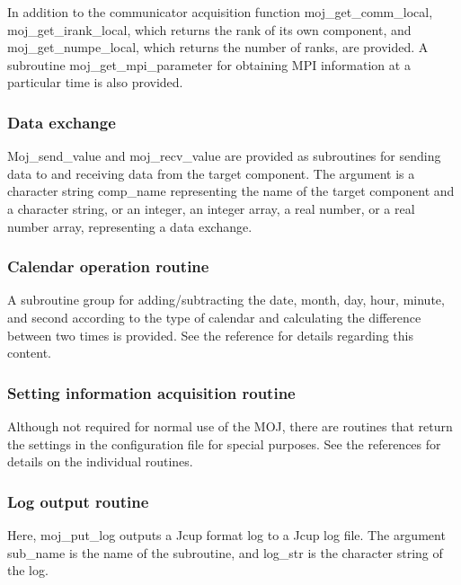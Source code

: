 In addition to the communicator acquisition function
moj\_get\_comm\_local, moj\_get\_irank\_local, which returns the rank of
its own component, and moj\_get\_numpe\_local, which returns the number
of ranks, are provided. A subroutine moj\_get\_mpi\_parameter for
obtaining MPI information at a particular time is also provided.

\hypertarget{data-exchange-1}{%
\subsubsection{Data exchange}\label{data-exchange-1}}

Moj\_send\_value and moj\_recv\_value are provided as subroutines for
sending data to and receiving data from the target component. The
argument is a character string comp\_name representing the name of the
target component and a character string, or an integer, an integer
array, a real number, or a real number array, representing a data
exchange.

\hypertarget{calendar-operation-routine}{%
\subsubsection{Calendar operation
routine}\label{calendar-operation-routine}}

A subroutine group for adding/subtracting the date, month, day, hour,
minute, and second according to the type of calendar and calculating the
difference between two times is provided. See the reference for details
regarding this content.

\hypertarget{setting-information-acquisition-routine}{%
\subsubsection{Setting information acquisition
routine}\label{setting-information-acquisition-routine}}

Although not required for normal use of the MOJ, there are routines that
return the settings in the configuration file for special purposes. See
the references for details on the individual routines.

\hypertarget{log-output-routine}{%
\subsubsection{Log output routine}\label{log-output-routine}}

Here, moj\_put\_log outputs a Jcup format log to a Jcup log file. The
argument sub\_name is the name of the subroutine, and log\_str is the
character string of the log.

